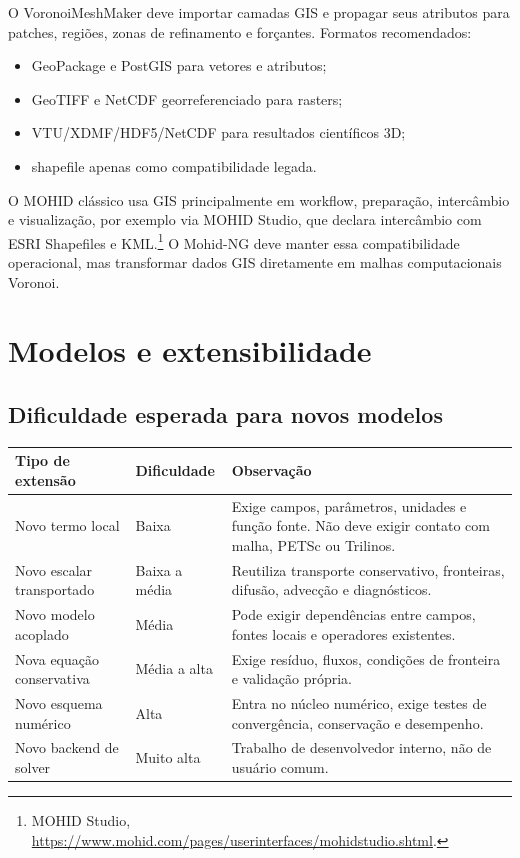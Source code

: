 \documentclass[11pt,a4paper]{article}
\begin{document}
O VoronoiMeshMaker deve importar camadas GIS e propagar seus atributos para patches, regi\~oes, zonas de refinamento e for\c{c}antes. Formatos recomendados:
\begin{itemize}
  \item GeoPackage e PostGIS para vetores e atributos;
  \item GeoTIFF e NetCDF georreferenciado para rasters;
  \item VTU/XDMF/HDF5/NetCDF para resultados cient\'ificos 3D;
  \item shapefile apenas como compatibilidade legada.
\end{itemize}

O MOHID cl\'assico usa GIS principalmente em workflow, prepara\c{c}\~ao, interc\^ambio e visualiza\c{c}\~ao, por exemplo via MOHID Studio, que declara interc\^ambio com ESRI Shapefiles e KML.\footnote{MOHID Studio, \url{https://www.mohid.com/pages/userinterfaces/mohidstudio.shtml}.} O Mohid-NG deve manter essa compatibilidade operacional, mas transformar dados GIS diretamente em malhas computacionais Voronoi.

\section{Modelos e extensibilidade}

\subsection{Dificuldade esperada para novos modelos}

\begin{longtable}{p{}p{}p{}}
\toprule
\textbf{Tipo de extens\~ao} & \textbf{Dificuldade} & \textbf{Observa\c{c}\~ao}\tabularnewline
\midrule
Novo termo local & Baixa & Exige campos, par\^ametros, unidades e fun\c{c}\~ao fonte. N\~ao deve exigir contato com malha, PETSc ou Trilinos.\tabularnewline
Novo escalar transportado & Baixa a m\'edia & Reutiliza transporte conservativo, fronteiras, difus\~ao, advec\c{c}\~ao e diagn\'osticos.\tabularnewline
Novo modelo acoplado & M\'edia & Pode exigir depend\^encias entre campos, fontes locais e operadores existentes.\tabularnewline
Nova equa\c{c}\~ao conservativa & M\'edia a alta & Exige res\'iduo, fluxos, condi\c{c}\~oes de fronteira e valida\c{c}\~ao pr\'opria.\tabularnewline
Novo esquema num\'erico & Alta & Entra no n\'ucleo num\'erico, exige testes de converg\^encia, conserva\c{c}\~ao e desempenho.\tabularnewline
Novo backend de solver & Muito alta & Trabalho de desenvolvedor interno, n\~ao de usu\'ario comum.\tabularnewline
\bottomrule
\end{longtable}
\end{document}

